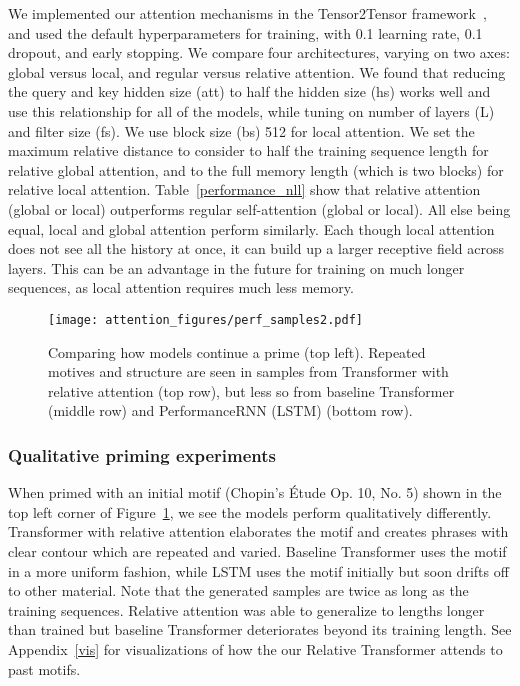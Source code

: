 \documentclass{article} \usepackage{iclr2019_conference,times}
\begin{document}
We implemented our attention mechanisms in the Tensor2Tensor framework~\citep{tensor2tensor}, and used the default hyperparameters for training, with 0.1 learning rate, 0.1 dropout, and early stopping.
We compare four architectures, varying on two axes: global versus local, and regular versus relative attention. 
We found that reducing the query and key hidden size (att) to half the hidden size (hs) works well and use this relationship for all of the models, while tuning on number of layers (L) and filter size (fs). We use block size (bs) 512 for local attention. We set the maximum relative distance to consider to half the training sequence length for relative global attention, and to the full memory length (which is two blocks) for relative local attention.
Table~\ref{performance_nll} show that relative attention (global or local) outperforms regular self-attention (global or local). All else being equal, local and global attention perform similarly.  Each though local attention does not see all the history at once, it can build up a larger receptive field across layers.  This can be an advantage in the future for training on much longer sequences, as local attention requires much less memory.










\begin{figure}[H]
\vskip -0.1in
\begin{center}
\centerline{\texttt{[image: attention\_figures/perf\_samples2.pdf]}}
\caption{Comparing how models continue a prime (top left).  Repeated motives and structure are seen in samples from Transformer with relative attention (top row), but less so from baseline Transformer (middle row) and PerformanceRNN (LSTM) (bottom row).}
\label{fig:perf_sample}
\end{center}
\vskip -0.2in
\end{figure}

\subsubsection{Qualitative priming experiments} \label{sec:priming}
When primed with an initial motif (Chopin's Étude Op. 10, No. 5)
shown in the top left corner of Figure~\ref{fig:perf_sample}, we see the models perform qualitatively differently. Transformer with relative attention elaborates the motif and creates phrases with clear contour which are repeated and varied.  Baseline Transformer uses the motif in a more uniform fashion, while LSTM uses the motif initially but soon drifts off to other material.   
Note that the generated samples are twice as long as the training sequences.  Relative attention was able to generalize to lengths longer than trained but baseline Transformer deteriorates beyond its training length. See Appendix~\ref{vis} for visualizations of how the our Relative Transformer attends to past motifs.
\end{document}
